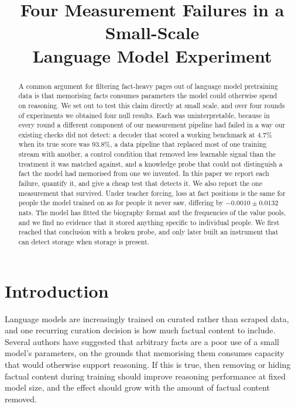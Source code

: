 \documentclass[10pt,twocolumn]{article}
\title{\bfseries Four Measurement Failures in a Small-Scale\\
Language Model Experiment}
\author{}
\date{}
\begin{document}
\maketitle
\vspace{-5em}

\begin{abstract}
\noindent
A common argument for filtering fact-heavy pages out of language model
pretraining data is that memorising facts consumes parameters the model could
otherwise spend on reasoning. We set out to test this claim directly at small
scale, and over four rounds of experiments we obtained four null results. Each was
uninterpretable, because in every round a different component of our
measurement pipeline had failed in a way our existing checks did not detect: a decoder that scored a working benchmark at 4.7\% when its true score
was 93.8\%, a data pipeline that replaced most of one training stream with
another, a control condition that removed less learnable signal than the
treatment it was matched against, and a knowledge probe that could not
distinguish a fact the model had memorised from one we invented. In this paper
we report each failure, quantify it, and give a cheap test that detects it. We
also report the one measurement that survived. Under teacher forcing, loss at
fact positions is the same for people the model trained on as for people it
never saw, differing by $-0.0010 \pm 0.0132$ nats. The model has fitted the
biography format and the frequencies of the value pools, and we find no
evidence that it stored anything specific to individual people. We first
reached that conclusion with a broken probe, and only later built an instrument
that can detect storage when storage is present.
\end{abstract}

\section{Introduction}

Language models are increasingly trained on curated rather than scraped data,
and one recurring curation decision is how much factual content to include.
Several authors have suggested that arbitrary facts are a poor use of a small
model's parameters, on the grounds that memorising them consumes capacity that
would otherwise support reasoning. If this is true, then removing or hiding
factual content during training should improve reasoning performance at fixed
model size, and the effect should grow with the amount of factual content
removed.
\end{document}

